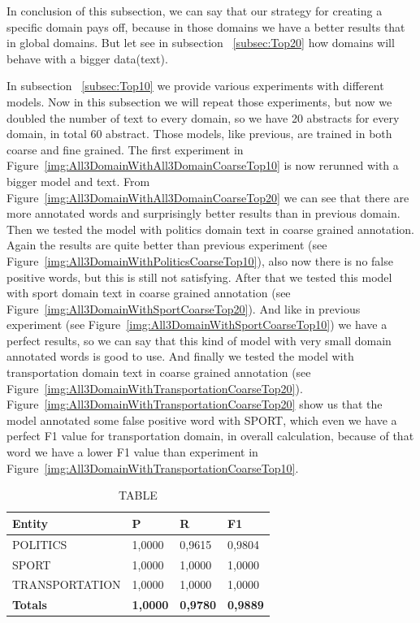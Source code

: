 \documentclass[thesis=M,english]{FITthesis}[2018/05/30]
\begin{document}
	In conclusion of this subsection, we can say that our strategy for creating a specific domain pays off, because in those domains we have a better results that in global domains. But let see in subsection ~\ref{subsec:Top20} how domains will behave with a bigger data(text).

	In subsection ~\ref{subsec:Top10} we provide various experiments with different models. Now in this subsection we will repeat those experiments, but now we doubled the number of text to every domain, so we have 20 abstracts for every domain, in total 60 abstract. Those models, like previous, are trained in both coarse and fine grained.
	The first experiment in Figure~\ref{img:All3DomainWithAll3DomainCoarseTop10} is now rerunned with a bigger model and text. From Figure~\ref{img:All3DomainWithAll3DomainCoarseTop20} we can see that there are more annotated words and surprisingly better results than in previous domain.
	Then we tested the model with politics domain text in coarse grained annotation. Again the results are quite better than previous experiment (see Figure~\ref{img:All3DomainWithPoliticsCoarseTop10}), also now there is no false positive words, but this is still not satisfying.
	After that we tested this model with sport domain text in coarse grained annotation (see Figure~\ref{img:All3DomainWithSportCoarseTop20}). And like in previous experiment (see Figure~\ref{img:All3DomainWithSportCoarseTop10}) we have a perfect results, so we can say that this kind of model with very small domain annotated words is good to use.
	And finally we tested the model with transportation domain text in coarse grained annotation (see Figure~\ref{img:All3DomainWithTransportationCoarseTop20}). Figure~\ref{img:All3DomainWithTransportationCoarseTop20} show us that the model annotated some false positive word with SPORT, which even we have a perfect F1 value for transportation domain, in overall calculation, because of that word we have a lower F1 value than experiment in Figure~\ref{img:All3DomainWithTransportationCoarseTop10}.

	\begin{table}[H]\centering
		\caption{TABLE}
		\label{}
		\begin{tabular}{|l|l|l|l|}
			\hline {\textbf{Entity}} & {\textbf{P}} & {\textbf{R}} & {\textbf{F1}}\\\hline
				POLITICS & 1,0000 & 0,9615 & 0,9804\\
				SPORT & 1,0000 & 1,0000 & 1,0000\\
				TRANSPORTATION & 1,0000 & 1,0000 & 1,0000\\\hline
				\textbf{Totals} & \textbf{1,0000} & \textbf{0,9780} & \textbf{0,9889}\\\hline
		\end{tabular}
	\end{table}
\end{document}
